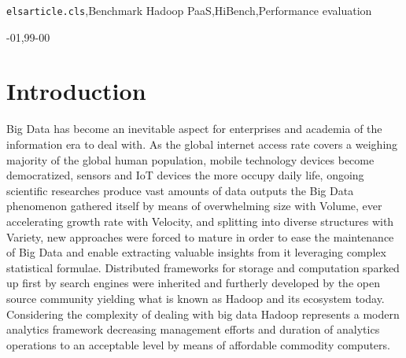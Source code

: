 \documentclass[review]{elsarticle}
\begin{document}
\begin{frontmatter}
\begin{keyword}
\texttt{elsarticle.cls}\sep Benchmark Hadoop PaaS\sep HiBench\sep Performance evaluation

-01\sep  99-00
\end{keyword}

\end{frontmatter}

\linenumbers

\section{Introduction}

Big Data has become an inevitable aspect for enterprises and academia of the information era to deal with. As the global internet access rate covers a weighing majority of the global human population, mobile technology devices become democratized, sensors and IoT devices the more occupy daily life, ongoing scientific researches produce vast amounts of data outputs the Big Data phenomenon gathered itself by means of overwhelming size with Volume, ever accelerating growth rate with Velocity, and splitting into diverse structures with Variety, new approaches were forced to mature in order to ease the maintenance of Big Data and enable extracting valuable insights from it leveraging complex statistical formulae. Distributed frameworks for storage and computation sparked up first by search engines were inherited and furtherly developed by the open source community yielding what is known as Hadoop and its ecosystem today. Considering the complexity of dealing with big data Hadoop represents a modern analytics framework decreasing management efforts and duration of analytics operations to an acceptable level by means of affordable commodity computers.
\end{document}
